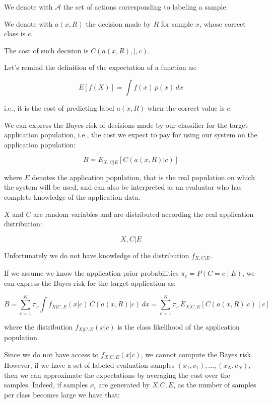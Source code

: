 We denote with $\mathcal{A}$ the set of actions corresponding to labeling a sample.

We denote with $a(x, R)$ the decision made by $R$ for sample $x$, whose correct class is $c$.

The cost of such decision is $C(a(x,R),|,c)$.

Let's remind the definition of the expectation of a function as:

\begin{equation*}
E[f(X)] = \int f(x)\,p(x)\,dx
\end{equation*}

i.e., it is the cost of predicting label $a(x,R)$ when the correct value is $c$.

We can express the Bayes risk of decisions made by our classifier for the target application population, i.e., the cost we expect to pay for using our system on the application population:

\begin{equation*}
B = E_{X,C|E}[C(a(x,R)|c)]
\end{equation*}

where $E$ denotes the application population, that is the real population on which the system will be used, and can also be interpreted as an evaluator who has complete knowledge of the application data.

$X$ and $C$ are random variables and are distributed according the real application distribution:

\begin{equation*}
X, C|E
\end{equation*}

Unfortunately we do not have knowledge of the distribution $f_{X,C|E}$.

If we assume we know the application prior probabilities $\pi_c = P(C = c \mid E)$, we can express the Bayes risk for the target application as:

\begin{equation*}
B = \sum_{c=1}^K \pi_c \int f_{X|C,E}(x|c)\,C(a(x,R)|c)\,dx = \sum_{c=1}^K \pi_c\,E_{X|C,E}[C(a(x,R)|c)\mid c]
\end{equation*}

where the distribution $f_{X|C,E}(x|c)$ is the class likelihood of the application population.

Since we do not have access to $f_{X|C,E}(x|c)$, we cannot compute the Bayes risk. However, if we have a set of labeled evaluation samples $(x_1, c_1), \ldots, (x_N, c_N)$, then we can approximate the expectations by averaging the cost over the samples. Indeed, if samples $x_i$ are generated by $X|C,E$, as the number of samples per class becomes large we have that:

